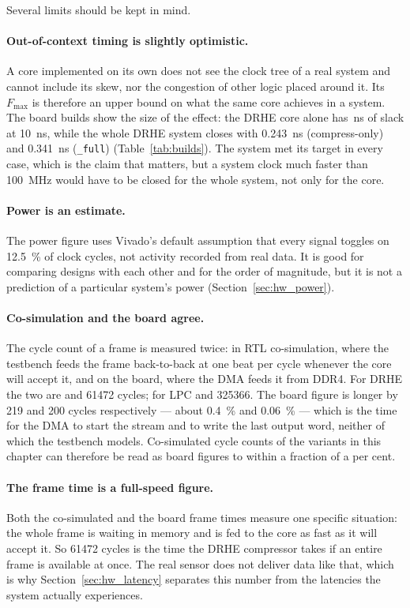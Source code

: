 Several limits should be kept in mind.

\paragraph{Out-of-context timing is slightly optimistic.} A core implemented on
its own does not see the clock tree of a real system and cannot include its
skew, nor the congestion of other logic placed around it. Its $F_{\max}$ is
therefore an upper bound on what the same core achieves in a system. The board
builds show the size of the effect: the DRHE core alone has \,ns
of slack at \SI{10}{\nano\second}, while the whole DRHE system closes with
\SI{0.243}{\nano\second} (compress-only) and \SI{0.341}{\nano\second}
(\texttt{\_full}) (Table~\ref{tab:builds}). The system met its target in every
case, which is the claim that matters, but a system clock much faster than
\SI{100}{\mega\hertz} would have to be closed for the whole system, not only
for the core.

\paragraph{Power is an estimate.} The power figure uses Vivado's default
assumption that every signal toggles on \SI{12.5}{\percent} of clock cycles, not
activity recorded from real data. It is good for comparing designs with each
other and for the order of magnitude, but it is not a prediction of a
particular system's power (Section~\ref{sec:hw_power}).

\paragraph{Co-simulation and the board agree.} The cycle count of a frame is
measured twice: in RTL co-simulation, where the testbench feeds the frame
back-to-back at one beat per cycle whenever the core will accept it, and on the
board, where the DMA feeds it from DDR4. For DRHE the two are 
and \num{61472} cycles; for LPC  and \num{325366}. The board
figure is longer by 219 and 200 cycles respectively --- about
\SI{0.4}{\percent} and \SI{0.06}{\percent} --- which is the time for the DMA
to start the stream and to write the last output word, neither of which the
testbench models. Co-simulated cycle counts of the variants in this chapter can
therefore be read as board figures to within a fraction of a per cent.

\paragraph{The frame time is a full-speed figure.} Both the co-simulated and
the board frame times measure one specific situation: the whole frame is
waiting in memory and is fed to the core as fast as it will accept it. So
\num{61472} cycles is the time the DRHE compressor takes if an entire frame is
available at once. The real sensor does not deliver data like that, which is
why Section~\ref{sec:hw_latency} separates this number from the latencies the
system actually experiences.

